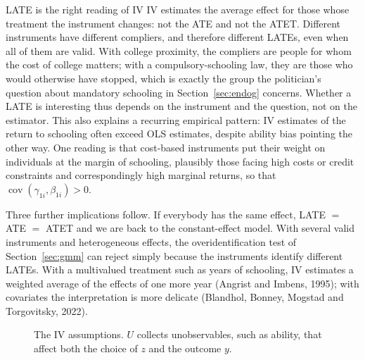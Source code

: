 \documentclass[11pt,a4paper]{article}
\newcommand{\Cov}{\operatorname{cov}}
\begin{document}
\begin{whybox}{LATE is the right reading of IV}
IV estimates the average effect for those whose treatment the instrument changes: not the ATE and not the ATET. Different instruments have different compliers, and therefore different LATEs, even when all of them are valid. With college proximity, the compliers are people for whom the cost of college matters; with a compulsory-schooling law, they are those who would otherwise have stopped, which is exactly the group the politician's question about mandatory schooling in Section~\ref{sec:endog} concerns. Whether a LATE is interesting thus depends on the instrument and the question, not on the estimator. This also explains a recurring empirical pattern: IV estimates of the return to schooling often exceed OLS estimates, despite ability bias pointing the other way. One reading is that cost-based instruments put their weight on individuals at the margin of schooling, plausibly those facing high costs or credit constraints and correspondingly high marginal returns, so that $\Cov(\gamma_{1i},\beta_{1i})>0$.

Three further implications follow. If everybody has the same effect, LATE $=$ ATE $=$ ATET and we are back to the constant-effect model. With several valid instruments and heterogeneous effects, the overidentification test of Section~\ref{sec:gmm} can reject simply because the instruments identify different LATEs. With a multivalued treatment such as years of schooling, IV estimates a weighted average of the effects of one more year (Angrist and Imbens, 1995); with covariates the interpretation is more delicate (Blandhol, Bonney, Mogstad and Torgovitsky, 2022).
\end{whybox}

\begin{figure}[h]
\centering
{}
\caption{The IV assumptions. $U$ collects unobservables, such as ability, that affect both the choice of $z$ and the outcome $y$.}\label{fig:iv}
\end{figure}
\end{document}
